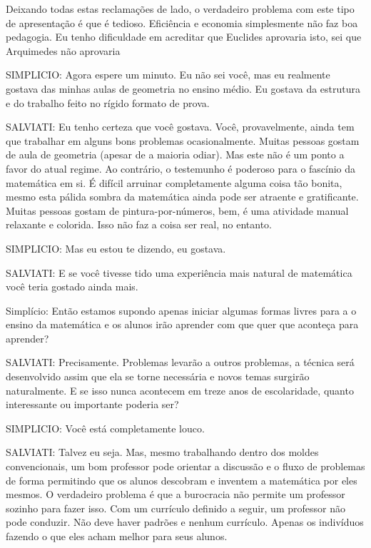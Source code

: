 \documentclass[a4paper,oneside,12pt,notitlepage]{article}
\begin{document}



Deixando todas estas reclamações de lado, o verdadeiro problema com este tipo de apresentação é que é tedioso. Eficiência e economia simplesmente não faz boa pedagogia. Eu tenho dificuldade em acreditar que Euclides aprovaria isto, sei que Arquimedes não aprovaria 

SIMPLICIO: Agora espere um minuto. Eu não sei você, mas eu realmente gostava das minhas aulas de geometria no ensino médio. Eu gostava da estrutura e do trabalho feito no rígido formato de prova.

SALVIATI: Eu tenho certeza que você gostava. Você, provavelmente, ainda tem que trabalhar em alguns bons problemas ocasionalmente. Muitas pessoas gostam de aula de geometria (apesar de a maioria odiar). Mas este não é um ponto a favor do atual regime. Ao contrário, o testemunho é poderoso para o fascínio da matemática em si. É difícil arruinar completamente alguma coisa tão bonita, mesmo esta pálida sombra da matemática ainda pode ser atraente e gratificante. Muitas pessoas gostam de pintura-por-números, bem, é uma atividade manual relaxante e colorida. Isso não faz a coisa ser real, no entanto.

SIMPLICIO: Mas eu estou te dizendo, eu gostava. 

SALVIATI: E se você tivesse tido uma experiência mais natural de matemática você teria gostado ainda mais.

Simplício: Então estamos supondo apenas iniciar algumas formas livres para a o ensino da matemática e os alunos irão aprender com que quer que aconteça para aprender? 

SALVIATI: Precisamente. Problemas levarão a outros problemas, a técnica será desenvolvido assim que ela se torne necessária e novos temas surgirão naturalmente. E se isso nunca acontecem em treze anos de escolaridade, quanto interessante ou importante poderia ser? 

SIMPLICIO: Você está completamente louco. 

SALVIATI: Talvez eu seja. Mas, mesmo trabalhando dentro dos moldes convencionais, um bom professor pode orientar a discussão e o fluxo de problemas de forma permitindo que os alunos descobram e inventem a matemática por eles mesmos. O verdadeiro problema é que a burocracia não permite um professor sozinho para fazer isso. Com um currículo definido a seguir, um professor não pode conduzir. Não deve haver padrões e nenhum currículo. Apenas os indivíduos fazendo o que eles acham melhor para seus alunos.
\end{document}
